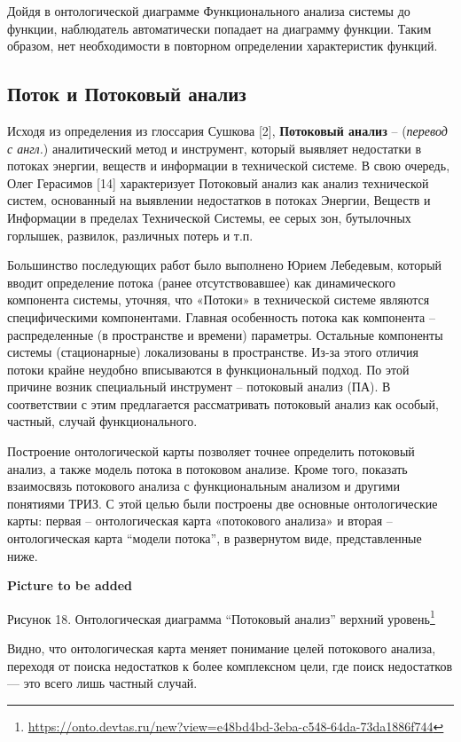\documentclass[11pt,a4paper]{article}
\newcommand{\addpicture}{\textbf{Picture to be added}\par}
\begin{document}
Дойдя в онтологической диаграмме Функционального анализа системы до функции,
наблюдатель автоматически попадает на диаграмму функции. Таким образом, нет
необходимости в повторном определении характеристик функций.

\subsection{Поток и Потоковый анализ}

Исходя из определения из глоссария Сушкова [2], \textbf{Потоковый анализ} --
(\emph{перевод с англ.}) аналитический метод и инструмент, который выявляет
недостатки в потоках энергии, веществ и информации в технической системе. В
свою очередь, Олег Герасимов [14] характеризует Потоковый анализ как анализ
технической систем, основанный на выявлении недостатков в потоках Энергии,
Веществ и Информации в пределах Технической Системы, ее серых зон, бутылочных
горлышек, развилок, различных потерь и т.п.

Большинство последующих работ было выполнено Юрием Лебедевым, который вводит
определение потока (ранее отсутствовавшее) как динамического компонента
системы, уточняя, что «Потоки» в технической системе являются специфическими
компонентами. Главная особенность потока как компонента – распределенные (в
пространстве и времени) параметры. Остальные компоненты системы (стационарные)
локализованы в пространстве. Из-за этого отличия потоки крайне неудобно
вписываются в функциональный подход. По этой причине возник специальный
инструмент – потоковый анализ (ПА). В соответствии с этим предлагается
рассматривать потоковый анализ как особый, частный, случай функционального.

Построение онтологической карты позволяет точнее определить потоковый анализ,
а также модель потока в потоковом анализе. Кроме того, показать взаимосвязь
потокового анализа с функциональным анализом и другими понятиями ТРИЗ. С этой
целью были построены две основные онтологические карты: первая --
онтологическая карта «потокового анализа» и вторая -- онтологическая карта
“модели потока”, в развернутом виде, представленные ниже.
\begin{center}
  \addpicture
  Рисунок 18. Онтологическая диаграмма “Потоковый анализ” верхний
  уровень\footnote{\url{https://onto.devtas.ru/new?view=e48bd4bd-3eba-c548-64da-73da1886f744}} 
\end{center}
Видно,
что онтологическая карта меняет понимание целей потокового анализа, переходя
от поиска недостатков к более комплексном цели, где поиск недостатков — это
всего лишь частный случай.
\end{document}
